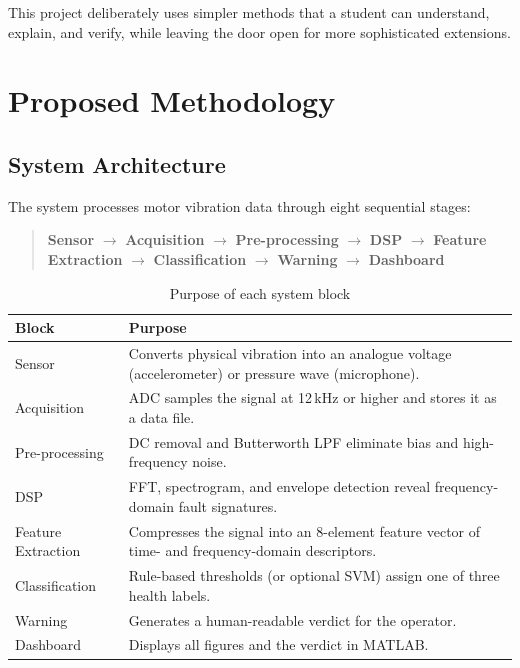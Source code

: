 \documentclass[12pt,a4paper]{article}
\begin{document}
This project deliberately uses simpler methods that a student can
understand, explain, and verify, while leaving the door open for
more sophisticated extensions.

\section{Proposed Methodology}

\subsection{System Architecture}

The system processes motor vibration data through eight sequential
stages:

\begin{quote}
\textbf{Sensor} $\rightarrow$ \textbf{Acquisition} $\rightarrow$
\textbf{Pre-processing} $\rightarrow$ \textbf{DSP}
$\rightarrow$ \textbf{Feature Extraction} $\rightarrow$
\textbf{Classification} $\rightarrow$ \textbf{Warning}
$\rightarrow$ \textbf{Dashboard}
\end{quote}

\begin{table}[htbp]
\centering
\caption{Purpose of each system block}
\begin{tabular}{@{}p{3.5cm}p{9.5cm}@{}}
\toprule
\textbf{Block} & \textbf{Purpose} \\
\midrule
Sensor & Converts physical vibration into an analogue voltage
  (accelerometer) or pressure wave (microphone). \\
Acquisition & ADC samples the signal at 12\,kHz or higher and
  stores it as a data file. \\
Pre-processing & DC removal and Butterworth LPF eliminate bias and
  high-frequency noise. \\
DSP & FFT, spectrogram, and envelope detection reveal
  frequency-domain fault signatures. \\
Feature Extraction & Compresses the signal into an 8-element
  feature vector of time- and frequency-domain descriptors. \\
Classification & Rule-based thresholds (or optional SVM) assign
  one of three health labels. \\
Warning & Generates a human-readable verdict for the operator. \\
Dashboard & Displays all figures and the verdict in MATLAB. \\
\bottomrule
\end{tabular}
\label{tab:blocks}
\end{table}
\end{document}
